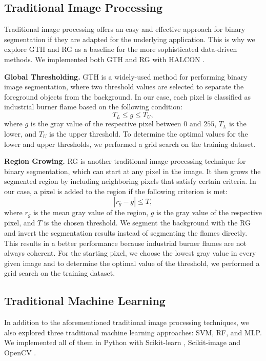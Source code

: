 \documentclass{isprs} %
\begin{document}
\subsection{Traditional Image Processing}
Traditional image processing offers an easy and effective approach for binary segmentation if they are adapted for the underlying application. This is why we explore GTH and RG as a baseline for the more sophisticated data-driven methods. We implemented both GTH and RG with HALCON \citep{halcon}.

\textbf{Global Thresholding.} GTH is a widely-used method for performing binary image segmentation, where two threshold values are selected to separate the foreground objects from the background. In our case, each pixel is classified as industrial burner flame based on the following condition:
\begin{equation}
    T_{L} \le g \le T_{U}, 
\end{equation}
where $g$ is the gray value of the respective pixel between $0$ and $255$, $T_{L}$ is the lower, and $T_{U}$ is the upper threshold. To determine the optimal values for the lower and upper thresholds, we performed a grid search on the training dataset. 

\textbf{Region Growing.} RG is another traditional image processing technique for binary segmentation, which can start at any pixel in the image. It then grows the segmented region by including neighboring pixels that satisfy certain criteria. In our case, a pixel is added to the region if the following criterion is met:
\begin{equation}
    | r_{\overline{g}} - g | \le T,
\end{equation}
where $r_{\overline{g}}$ is the mean gray value of the region, $g$ is the gray value of the respective pixel, and $T$ is the chosen threshold. We segment the background with the RG and invert the segmentation results instead of segmenting the flames directly. This results in a better performance because industrial burner flames are not always coherent. For the starting pixel, we choose the lowest gray value in every given image and to determine the optimal value of the threshold, we performed a grid search on the training dataset.

\subsection{Traditional Machine Learning}
In addition to the aforementioned traditional image processing techniques, we also explored three traditional machine learning approaches: SVM, RF, and MLP. We implemented all of them in Python with Scikit-learn \citep{pedregosa2011scikit}, Scikit-image \citep{van2014scikit} and OpenCV \citep{bradski2000opencv}.
\end{document}
